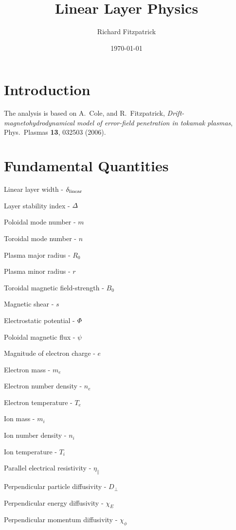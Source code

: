 \documentclass[notitlepage,12pt]{article}
\title{\bf Linear Layer Physics}
\date{\today}
\author{Richard Fitzpatrick}
\begin{document}
\maketitle

\section{Introduction}
The analysis is based on A.~Cole, and R.~Fitzpatrick,
{\em Drift-magnetohydrodynamical model of error-field penetration in tokamak plasmas},
Phys.\ Plasmas {\bf 13}, 032503 (2006).
\section{Fundamental Quantities}
\begin{description}
\item Linear layer width - $\delta_{\rm linear}$
\item Layer stability index - ${\mit\Delta}$
\item Poloidal mode number - $m$
\item Toroidal mode number - $n$
\item Plasma major radius - $R_0$
\item Plasma minor radius - $r$
\item Toroidal magnetic field-strength - $B_0$
\item Magnetic shear - $s$
\item Electrostatic potential - ${\mit\Phi}$
\item Poloidal magnetic flux - $\psi$
\item Magnitude of electron charge - $e$
\item Electron mass - $m_e$
\item Electron number density - $n_e$
\item Electron temperature - $T_e$
\item Ion mass - $m_i$
\item Ion number density - $n_i$
\item Ion temperature - $T_i$
\item Parallel electrical resistivity - $\eta_\parallel$ 
\item Perpendicular particle diffusivity - $D_\perp$
\item Perpendicular energy diffusivity - $\chi_E$
\item Perpendicular momentum diffusivity - $\chi_\phi$ 
\end{description}
\end{document}

